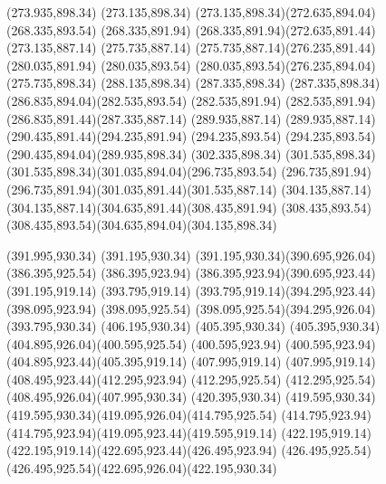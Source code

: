 {{		\moveto(273.935,898.34)
		\lineto(273.135,898.34)
		\curveto(273.135,898.34)(272.635,894.04)(268.335,893.54)
		\lineto(268.335,891.94)
		\curveto(268.335,891.94)(272.635,891.44)(273.135,887.14)
		\lineto(275.735,887.14)
		\curveto(275.735,887.14)(276.235,891.44)(280.035,891.94)
		\lineto(280.035,893.54)
		\curveto(280.035,893.54)(276.235,894.04)(275.735,898.34)
		\closepath
		\moveto(288.135,898.34)
		\lineto(287.335,898.34)
		\curveto(287.335,898.34)(286.835,894.04)(282.535,893.54)
		\lineto(282.535,891.94)
		\curveto(282.535,891.94)(286.835,891.44)(287.335,887.14)
		\lineto(289.935,887.14)
		\curveto(289.935,887.14)(290.435,891.44)(294.235,891.94)
		\lineto(294.235,893.54)
		\curveto(294.235,893.54)(290.435,894.04)(289.935,898.34)
		\closepath
		\moveto(302.335,898.34)
		\lineto(301.535,898.34)
		\curveto(301.535,898.34)(301.035,894.04)(296.735,893.54)
		\lineto(296.735,891.94)
		\curveto(296.735,891.94)(301.035,891.44)(301.535,887.14)
		\lineto(304.135,887.14)
		\curveto(304.135,887.14)(304.635,891.44)(308.435,891.94)
		\lineto(308.435,893.54)
		\curveto(308.435,893.54)(304.635,894.04)(304.135,898.34)
		\closepath
		
		\moveto(391.995,930.34)
		\lineto(391.195,930.34)
		\curveto(391.195,930.34)(390.695,926.04)(386.395,925.54)
		\lineto(386.395,923.94)
		\curveto(386.395,923.94)(390.695,923.44)(391.195,919.14)
		\lineto(393.795,919.14)
		\curveto(393.795,919.14)(394.295,923.44)(398.095,923.94)
		\lineto(398.095,925.54)
		\curveto(398.095,925.54)(394.295,926.04)(393.795,930.34)
		\closepath
		\moveto(406.195,930.34)
		\lineto(405.395,930.34)
		\curveto(405.395,930.34)(404.895,926.04)(400.595,925.54)
		\lineto(400.595,923.94)
		\curveto(400.595,923.94)(404.895,923.44)(405.395,919.14)
		\lineto(407.995,919.14)
		\curveto(407.995,919.14)(408.495,923.44)(412.295,923.94)
		\lineto(412.295,925.54)
		\curveto(412.295,925.54)(408.495,926.04)(407.995,930.34)
		\closepath
		\moveto(420.395,930.34)
		\lineto(419.595,930.34)
		\curveto(419.595,930.34)(419.095,926.04)(414.795,925.54)
		\lineto(414.795,923.94)
		\curveto(414.795,923.94)(419.095,923.44)(419.595,919.14)
		\lineto(422.195,919.14)
		\curveto(422.195,919.14)(422.695,923.44)(426.495,923.94)
		\lineto(426.495,925.54)
		\curveto(426.495,925.54)(422.695,926.04)(422.195,930.34)
		\closepath
		
}}
